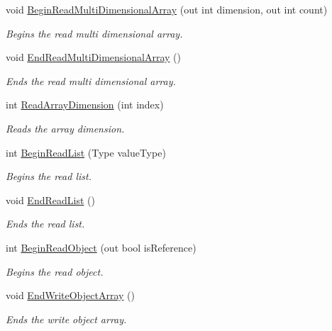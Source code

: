\begin{DoxyCompactItemize}
void \hyperlink{class_serialization_1_1_binary_serializer_ac4d785eb39bba193195761ff9bacd98c}{Begin\+Read\+Multi\+Dimensional\+Array} (out int dimension, out int count)
\begin{DoxyCompactList}\small\item\em Begins the read multi dimensional array. \end{DoxyCompactList}\item 
void \hyperlink{class_serialization_1_1_binary_serializer_a174c1b111506dcf2be86461ab54b00bc}{End\+Read\+Multi\+Dimensional\+Array} ()
\begin{DoxyCompactList}\small\item\em Ends the read multi dimensional array. \end{DoxyCompactList}\item 
int \hyperlink{class_serialization_1_1_binary_serializer_a82cdd27cb419e14f93f62e0947d3c109}{Read\+Array\+Dimension} (int index)
\begin{DoxyCompactList}\small\item\em Reads the array dimension. \end{DoxyCompactList}\item 
int \hyperlink{class_serialization_1_1_binary_serializer_ace00f8cacc0ff79bb16197d641964e4c}{Begin\+Read\+List} (Type value\+Type)
\begin{DoxyCompactList}\small\item\em Begins the read list. \end{DoxyCompactList}\item 
void \hyperlink{class_serialization_1_1_binary_serializer_aa4cb3eb6253054c5fe8bbebdc9c30c2f}{End\+Read\+List} ()
\begin{DoxyCompactList}\small\item\em Ends the read list. \end{DoxyCompactList}\item 
int \hyperlink{class_serialization_1_1_binary_serializer_a44117e9f1e92e01af20f98cbd674f638}{Begin\+Read\+Object} (out bool is\+Reference)
\begin{DoxyCompactList}\small\item\em Begins the read object. \end{DoxyCompactList}\item 
void \hyperlink{class_serialization_1_1_binary_serializer_acc36437ec400bb791655857fa98cfd40}{End\+Write\+Object\+Array} ()
\begin{DoxyCompactList}\small\item\em Ends the write object array. \end{DoxyCompactList}\item 

\end{DoxyCompactItemize}
